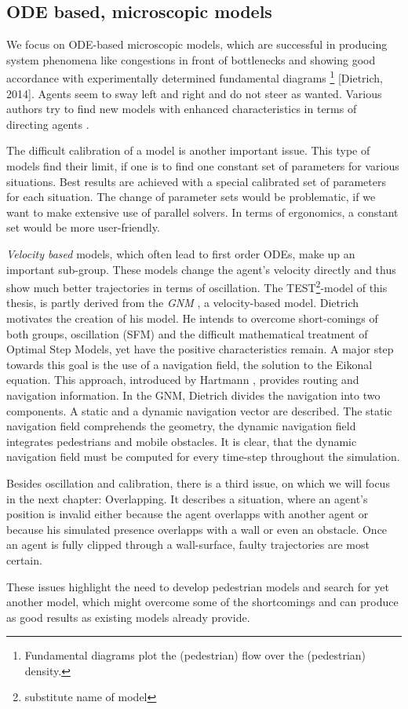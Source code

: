 \subsection{ODE based, microscopic models}

We focus on ODE-based microscopic models, which are successful in producing system phenomena like congestions in front of bottlenecks and showing good accordance with experimentally determined fundamental diagrams
\footnote{Fundamental diagrams plot the (pedestrian) flow over the (pedestrian) density.}
[Dietrich, 2014]. Agents seem to sway left and right and do not steer as wanted. Various authors try to find new models with enhanced characteristics in terms of directing agents \citep{Moussaid2011}\citep{Chraibi2011}.

The difficult calibration of a model is another important issue. This type of models find their limit, if one is to find one constant set of parameters for various situations. Best results are achieved with a special calibrated set of parameters for each situation. The change of parameter sets would be problematic, if we want to make extensive use of parallel solvers. In terms of ergonomics, a constant set would be more user-friendly. 

\emph{Velocity based} models, which often lead to first order ODEs, make up an important sub-group. These models change the agent's velocity directly and thus show much better trajectories in terms of oscillation. The TEST\footnote{substitute name of model}-model of this thesis, is partly derived from the \emph{GNM} \citep{Dietrich2014}, a velocity-based model. Dietrich motivates the creation of his model. He intends to overcome short-comings of both groups, oscillation (SFM) and the difficult mathematical treatment of Optimal Step Models, yet have the positive characteristics remain.
A major step towards this goal is the use of a navigation field, the solution to the Eikonal equation. This approach, introduced by Hartmann \citep{Hartmann2010}, provides routing and navigation information. In the GNM, Dietrich divides the navigation into two components. A static and a dynamic navigation vector are described. The static navigation field comprehends the geometry, the dynamic navigation field integrates pedestrians and mobile obstacles. It is clear, that the dynamic navigation field must be computed for every time-step throughout the simulation.

Besides oscillation and calibration, there is a third issue, on which we will focus in the next chapter: Overlapping. It describes a situation, where an agent's position is invalid either because the agent overlapps with another agent or because his simulated presence overlapps with a wall or even an obstacle. Once an agent is fully clipped through a wall-surface, faulty trajectories are most certain.

These issues highlight the need to develop pedestrian models and search for yet another model, which might overcome some of the shortcomings and can produce as good results as existing models already provide.